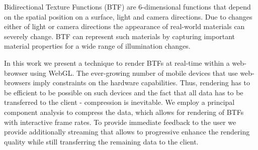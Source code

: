 Bidirectional Texture Functions (BTF) are 6-dimensional functions that depend on the spatial position on a surface, light and camera directions.
 Due to changes either of light or camera directions the appearance of real-world materials can severely change.
 BTF can represent such materials by capturing important material properties for a wide range of illumination changes.

In this work we present a technique to render BTFs at real-time within a web-browser using WebGL. 
The ever-growing number of mobile devices that use web-browsers imply constraints on the hardware capabilities.
Thus, rendering has to be efficient to be possible on such devices and the fact that all data has to be transferred to the client - compression is inevitable.  
We employ a principal component analysis to compress the data, which allows for rendering of BTFs with interactive frame rates. 
To provide immediate feedback to the user we provide additionally streaming that allows to progressive enhance the rendering quality
while still transferring the remaining data to the client. 





